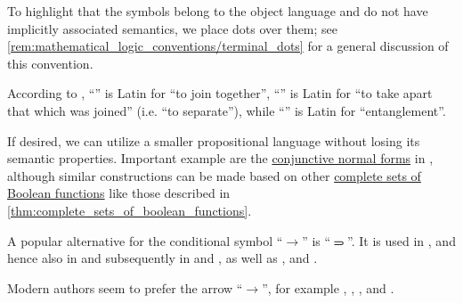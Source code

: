 \begin{comments}
  \item To highlight that the symbols belong to the object language and do not have implicitly associated semantics, we place dots over them; see \cref{rem:mathematical_logic_conventions/terminal_dots} for a general discussion of this convention.

  \item According to \textcite{Bello2013OriginsOfMathematicalWords}, \enquote{} is Latin for \enquote{to join together}, \enquote{} is Latin for \enquote{to take apart that which was joined} (i.e. \enquote{to separate}), while \enquote{} is Latin for \enquote{entanglement}.

  \item If desired, we can utilize a smaller propositional language without losing its semantic properties. Important example are the \hyperref[def:propositional_cnf_and_dnf]{conjunctive normal forms} in , although similar constructions can be made based on other \hyperref[def:boolean_closure/complete]{complete sets of Boolean functions} like those described in \cref{thm:complete_sets_of_boolean_functions}.

  \item A popular alternative for the conditional symbol \enquote{\( \rightarrow \)} is \enquote{\( \rightimply \)}. It is used in \cite[3]{Peano1908FormulatioMathematico}, and hence also in \cite[xvi]{WhiteheadRussell1927PrincipiaMathematicaVol1} and subsequently in \cite[44]{Church1956LogicVol1} and \cite[5]{Kleene2002Logic}, as well as \cite[44]{КолмогоровДрагалин2006ЛогикаВведение}, \cite[13]{Герасимов2014Вычислимость} and \cite[15]{Эдельман1975Логика}.

  Modern authors seem to prefer the arrow \enquote{\( \rightarrow \)}, for example \cite[14]{Hinman2005Logic}, \cite[def. 1.1.1(ii)]{VanDalen2004LogicAndStructure}, \cite[1]{TroelstraSchwichtenberg2000BasicProofTheory}, \cite[\S 2.1.1]{Mimram2020ProgramEqualsProof} and \cite[9]{ШеньВерещагин2017ЯзыкиИИсчисления}.
\end{comments}

